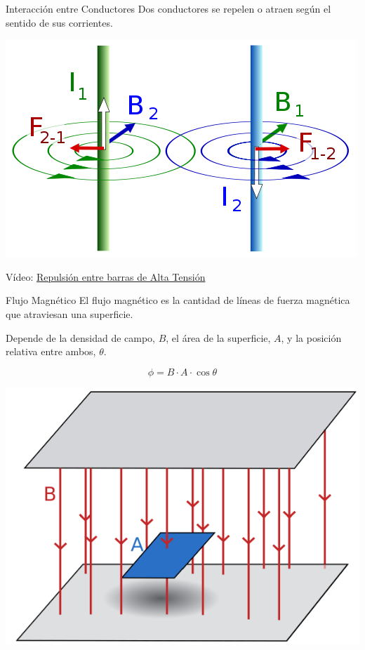 \documentclass[xcolor={usenames,svgnames,dvipsnames}]{beamer}
\begin{document}
\begin{frame}[label={sec:org8939aeb}]{Interacción entre Conductores}
Dos conductores se repelen o atraen según el sentido de sus corrientes.

\begin{center}
\includegraphics[width=.9\linewidth]{figs/FuerzasRepulsion.png}
\end{center}
\begin{center}
Vídeo: \href{https://www.youtube.com/watch?v=2j8D\_N1v0tU\&t=0m15s}{Repulsión entre barras de Alta Tensión}
\end{center}
\end{frame}
\begin{frame}[label={sec:org6607359}]{Flujo Magnético}
El flujo magnético es la cantidad de líneas de fuerza magnética que atraviesan una superficie. 

Depende de la densidad de campo, \(B\), el área de la superficie, \(A\), y la posición relativa entre ambos, \(\theta\).

\[
\phi = B \cdot A \cdot \cos \theta
\]
\begin{center}
\includegraphics[height=0.4\textheight]{figs/flujo_magnetico.pdf}
\end{center}
\end{frame}
\end{document}
